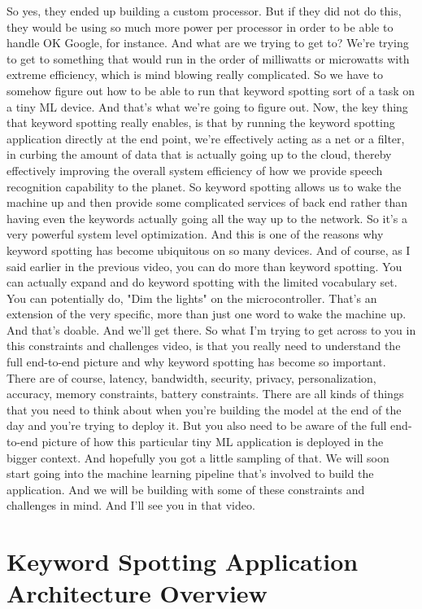 So yes, they ended up building a custom processor.
But if they did not do this, they would be
using so much more power per processor in order
to be able to handle OK Google, for instance.
And what are we trying to get to?
We're trying to get to something that would run in the order of milliwatts
or microwatts with extreme efficiency, which
is mind blowing really complicated.
So we have to somehow figure out how to be
able to run that keyword spotting sort of a task on a tiny ML device.
And that's what we're going to figure out.
Now, the key thing that keyword spotting really enables,
is that by running the keyword spotting application directly at the end point,
we're effectively acting as a net or a filter,
in curbing the amount of data that is actually going up to the cloud, thereby
effectively improving the overall system efficiency of how we provide speech
recognition capability to the planet.
So keyword spotting allows us to wake the machine up and then
provide some complicated services of back end
rather than having even the keywords actually going all the way up
to the network.
So it's a very powerful system level optimization.
And this is one of the reasons why keyword spotting has
become ubiquitous on so many devices.
And of course, as I said earlier in the previous video,
you can do more than keyword spotting.
You can actually expand and do keyword spotting
with the limited vocabulary set.
You can potentially do, "Dim the lights" on the microcontroller.
That's an extension of the very specific,
more than just one word to wake the machine up.
And that's doable.
And we'll get there.
So what I'm trying to get across to you in this constraints and challenges
video, is that you really need to understand the full end-to-end picture
and why keyword spotting has become so important.
There are of course, latency, bandwidth, security, privacy, personalization,
accuracy, memory constraints, battery constraints.
There are all kinds of things that you need
to think about when you're building the model at the end of the day
and you're trying to deploy it.
But you also need to be aware of the full end-to-end picture of how
this particular tiny ML application is deployed in the bigger context.
And hopefully you got a little sampling of that.
We will soon start going into the machine learning pipeline that's
involved to build the application.
And we will be building with some of these constraints
and challenges in mind.
And I'll see you in that video.

\section{Keyword Spotting Application Architecture Overview}

